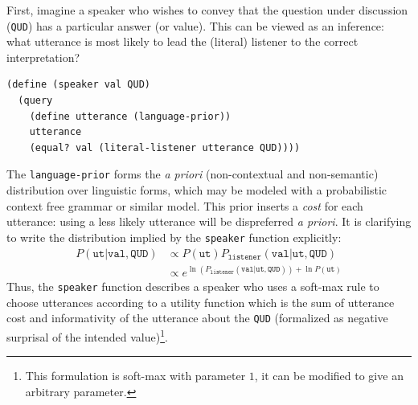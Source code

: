 \documentclass[pdfextras]{handbook}
\begin{document}
First, imagine a speaker who wishes to convey that the question under discussion (\lstinline{QUD}) has a particular answer (or value). This can be viewed as an inference: what utterance is most likely to lead the (literal) listener to the correct interpretation?
\begin{lstlisting}
(define (speaker val QUD)
  (query
    (define utterance (language-prior))
    utterance
    (equal? val (literal-listener utterance QUD))))
\end{lstlisting}
The \lstinline{language-prior} forms the \emph{a priori} (non-contextual and non-semantic) distribution over linguistic forms, which may be modeled with a probabilistic context free grammar or similar model. 
This prior inserts a \emph{cost} for each utterance: using a less likely utterance will be dispreferred \emph{a priori}.
It is clarifying to write the distribution implied by the \lstinline{speaker} function explicitly:
\begin{align}
P(\texttt{ut} | \texttt{val}, \texttt{QUD}) &\propto P(\texttt{ut}) P_{\texttt{listener}}(\texttt{val} | \texttt{ut}, \texttt{QUD}) \\
&\propto e^{\ln(P_{\texttt{listener}}(\texttt{val} | \texttt{ut}, \texttt{QUD})) + \ln{P(\texttt{ut})}}
\end{align}
Thus, the \lstinline{speaker} function describes a speaker who uses a soft-max rule \citep{luce59,suttonbarto98} to choose utterances according to a utility function which is the sum of utterance cost and informativity of the utterance about the \lstinline{QUD} (formalized as negative surprisal of the intended value)\footnote{This formulation is soft-max with parameter $1$, it can be modified to give an arbitrary parameter.}.
\end{document}
